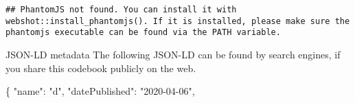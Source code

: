 \documentclass[
]{book}
\newenvironment{Shaded}{\begin{snugshade}}{\end{snugshade}}
\newcommand{\DataTypeTok}[1]{\textcolor[rgb]{0.13,0.29,0.53}{#1}}
\newcommand{\FunctionTok}[1]{\textcolor[rgb]{0.00,0.00,0.00}{#1}}
\newcommand{\StringTok}[1]{\textcolor[rgb]{0.31,0.60,0.02}{#1}}
\begin{document}
\begin{verbatim}
## PhantomJS not found. You can install it with webshot::install_phantomjs(). If it is installed, please make sure the phantomjs executable can be found via the PATH variable.
\end{verbatim}

\hypertarget{htmlwidget-1f9776313d0adbfaabaf}{}

JSON-LD metadata
The following JSON-LD can be found by search engines, if you share this codebook
publicly on the web.

\begin{Shaded}
\begin{Highlighting}[]
\FunctionTok{\{}
  \DataTypeTok{"name"}\FunctionTok{:} \StringTok{"d"}\FunctionTok{,}
  \DataTypeTok{"datePublished"}\FunctionTok{:} \StringTok{"2020-04-06"}\FunctionTok{,}

\end{Highlighting}
\end{Shaded}
\end{document}
